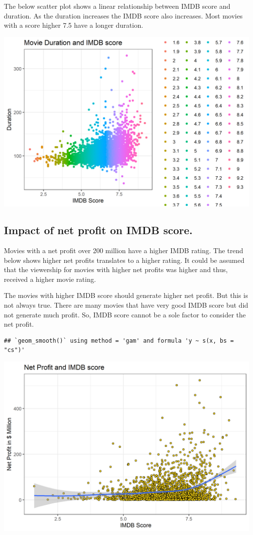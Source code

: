 \documentclass[
]{article}
\begin{document}
The below scatter plot shows a linear relationship between IMDB score
and duration. As the duration increases the IMDB score also increases.
Most movies with a score higher 7.5 have a longer duration.

\includegraphics[width=0.75\linewidth]{IMDB_files/figure-latex/movie duration-1}

\hypertarget{impact-of-net-profit-on-imdb-score.}{%
\subsection{Impact of net profit on IMDB
score.}\label{impact-of-net-profit-on-imdb-score.}}

Movies with a net profit over 200 million have a higher IMDB rating. The
trend below shows higher net profits translates to a higher rating. It
could be assumed that the viewership for movies with higher net profits
was higher and thus, received a higher movie rating.

The movies with higher IMDB score should generate higher net profit. But
this is not always true. There are many movies that have very good IMDB
score but did not generate much profit. So, IMDB score cannot be a sole
factor to consider the net profit.

\begin{verbatim}
## `geom_smooth()` using method = 'gam' and formula 'y ~ s(x, bs = "cs")'
\end{verbatim}

\includegraphics[width=0.75\linewidth]{IMDB_files/figure-latex/net profit-1}
\end{document}

